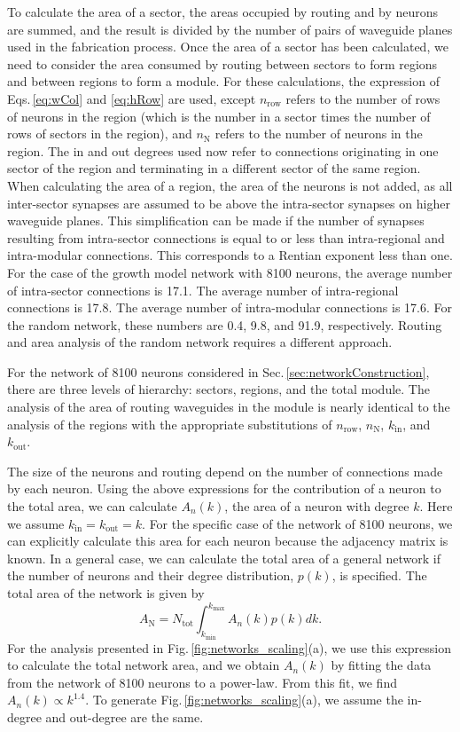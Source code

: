 \documentclass[aip,amsmath,amssymb,reprint,nofootinbib]{revtex4-1}
\begin{document}
To calculate the area of a sector, the areas occupied by routing and by neurons are summed, and the result is divided by the number of pairs of waveguide planes used in the fabrication process. Once the area of a sector has been calculated, we need to consider the area consumed by routing between sectors to form regions and between regions to form a module. For these calculations, the expression of Eqs.\,\ref{eq:wCol} and \ref{eq:hRow} are used, except $n_{\mathrm{row}}$ refers to the number of rows of neurons in the region (which is the number in a sector times the number of rows of sectors in the region), and $n_{\mathrm{N}}$ refers to the number of neurons in the region. The in and out degrees used now refer to connections originating in one sector of the region and terminating in a different sector of the same region. When calculating the area of a region, the area of the neurons is not added, as all inter-sector synapses are assumed to be above the intra-sector synapses on higher waveguide planes. This simplification can be made if the number of synapses resulting from intra-sector connections is equal to or less than intra-regional and intra-modular connections. This corresponds to a Rentian exponent less than one. For the case of the growth model network with 8100 neurons, the average number of intra-sector connections is 17.1. The average number of intra-regional connections is 17.8. The average number of intra-modular connections is 17.6. For the random network, these numbers are 0.4, 9.8, and 91.9, respectively. Routing and area analysis of the random network requires a different approach.

For the network of 8100 neurons considered in Sec.\,\ref{sec:networkConstruction}, there are three levels of hierarchy: sectors, regions, and the total module. The analysis of the area of routing waveguides in the module is nearly identical to the analysis of the regions with the appropriate substitutions of $n_{\mathrm{row}}$, $n_{\mathrm{N}}$, $k_{\mathrm{in}}$, and $k_{\mathrm{out}}$.

The size of the neurons and routing depend on the number of connections made by each neuron. Using the above expressions for the contribution of a neuron to the total area, we can calculate $A_n(k)$, the area of a neuron with degree $k$. Here we assume $k_{\mathrm{in}} = k_{\mathrm{out}} = k$. For the specific case of the network of 8100 neurons, we can explicitly calculate this area for each neuron because the adjacency matrix is known. In a general case, we can calculate the total area of a general network if the number of neurons and their degree distribution, $p(k)$, is specified. The total area of the network is given by
\begin{equation}
\label{eq:networkArea}
A_{\mathrm{N}} = N_{\mathrm{tot}}\int_{k_{\mathrm{min}}}^{k_{\mathrm{max}}}A_n(k)p(k)dk.
\end{equation}
For the analysis presented in Fig.\,\ref{fig:networks_scaling}(a), we use this expression to calculate the total network area, and we obtain $A_n(k)$ by fitting the data from the network of 8100 neurons to a power-law. From this fit, we find $A_n(k)\propto k^{1.4}$. To generate Fig.\,\ref{fig:networks_scaling}(a), we assume the in-degree and out-degree are the same. 
\end{document}
